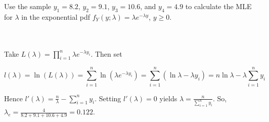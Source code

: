 Use the sample $y_1=8.2$, $y_2=9.1$, $y_3=10.6$, and $y_4=4.9$ to calculate the MLE for $\lambda$ in the
exponential pdf $f_Y(y;\lambda)=\lambda e^{-\lambda y}$, $y\geq0$.\\\\

\begin{solution}\renewcommand{\qedsymbol}{}\ \\
    Take $L(\lambda)=\prod_{i=1}^n\lambda e^{-\lambda y_i}.$ Then set

    $$l(\lambda)=\ln(L(\lambda))=\sum_{i=1}^n\ln(\lambda e^{-\lambda y_i})=
    \sum_{i=1}^n(\ln\lambda-\lambda y_i)=n\ln\lambda-\lambda\sum_{i=1}^ny_i$$

    Hence $l'(\lambda)=\frac{n}{\lambda}-\sum_{i=1}^ny_i$. Setting
    $l'(\lambda)=0$ yields $\lambda=\frac{n}{\sum_{i=1}^ny_i}$. So,
    $\lambda_e=\frac{4}{8.2+9.1+10.6+4.9}=0.122$.

\end{solution}